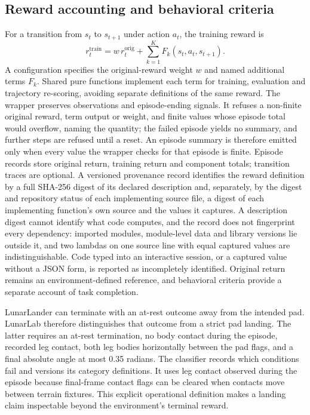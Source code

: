 \documentclass[preprint,12pt]{elsarticle}
\begin{document}
\subsection{Reward accounting and behavioral criteria}
For a transition from $s_t$ to $s_{t+1}$ under action $a_t$, the training reward is
\begin{equation}
 r_t^{\mathrm{train}}=w\,r_t^{\mathrm{orig}}+\sum_{k=1}^{K}F_k(s_t,a_t,s_{t+1}).
 \label{eq:accounting}
\end{equation}
A configuration specifies the original-reward weight $w$ and named additional terms $F_k$. Shared pure functions implement each term for training, evaluation and trajectory re-scoring, avoiding separate definitions of the same reward. The wrapper preserves observations and episode-ending signals. It refuses a non-finite original reward, term output or weight, and finite values whose episode total would overflow, naming the quantity; the failed episode yields no summary, and further steps are refused until a reset. An episode summary is therefore emitted only when every value the wrapper checks for that episode is finite. Episode records store original return, training return and component totals; transition traces are optional. A versioned provenance record identifies the reward definition by a full SHA-256 digest of its declared description and, separately, by the digest and repository status of each implementing source file, a digest of each implementing function's own source and the values it captures. A description digest cannot identify what code computes, and the record does not fingerprint every dependency: imported modules, module-level data and library versions lie outside it, and two lambdas on one source line with equal captured values are indistinguishable. Code typed into an interactive session, or a captured value without a JSON form, is reported as incompletely identified. Original return remains an environment-defined reference, and behavioral criteria provide a separate account of task completion.

LunarLander can terminate with an at-rest outcome away from the intended pad. LunarLab therefore distinguishes that outcome from a strict pad landing. The latter requires an at-rest termination, no body contact during the episode, recorded leg contact, both leg bodies horizontally between the pad flags, and a final absolute angle at most 0.35 radians. The classifier records which conditions fail and versions its category definitions. It uses leg contact observed during the episode because final-frame contact flags can be cleared when contacts move between terrain fixtures. This explicit operational definition makes a landing claim inspectable beyond the environment's terminal reward.
\end{document}
